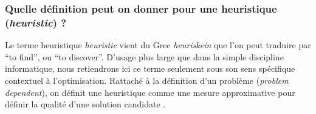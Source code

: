 
\subsubsection{Quelle définition peut on donner pour une heuristique (\textit{heuristic}) ? }
\label{sssec:heuristique}

Le terme heuristique \textit{heuristic} vient du Grec \textit{heuriskein} que l'on peut traduire par \foreignquote{english}{to find}, ou \foreignquote{english}{to discover}. D'usage plus large que dans la simple discipline informatique, nous retiendrons ici ce terme seulement sous son sens spécifique contextuel à l'optimisation. Rattaché à la définition d'un problème (\textit{problem dependent}), on définit une heuristique comme une mesure approximative pour définir la qualité d'une solution candidate \autocite[34]{Weise2011}.

